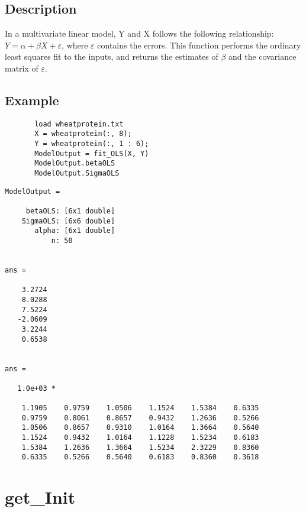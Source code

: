 \documentclass[a4paper,11pt,openany]{memoir}
\begin{document}
\subsection*{Description}

\begin{par}
In a multivariate linear model, Y and X follows the following relationship: $Y=\alpha+\beta X+\varepsilon$, where $\varepsilon$ contains the errors.  This function performs the ordinary least squares fit to the inputs, and returns the estimates of $\beta$ and the covariance matrix of $\varepsilon$.
\end{par} \vspace{1em}


\subsection*{Example}


\begin{verbatim}       load wheatprotein.txt
       X = wheatprotein(:, 8);
       Y = wheatprotein(:, 1 : 6);
       ModelOutput = fit_OLS(X, Y)
       ModelOutput.betaOLS
       ModelOutput.SigmaOLS\end{verbatim}
    
        \color{lightgray}\ttfamily \begin{verbatim}
ModelOutput = 

     betaOLS: [6x1 double]
    SigmaOLS: [6x6 double]
       alpha: [6x1 double]
           n: 50


ans =

    3.2724
    8.0288
    7.5224
   -2.0609
    3.2244
    0.6538


ans =

   1.0e+03 *

    1.1905    0.9759    1.0506    1.1524    1.5384    0.6335
    0.9759    0.8061    0.8657    0.9432    1.2636    0.5266
    1.0506    0.8657    0.9310    1.0164    1.3664    0.5640
    1.1524    0.9432    1.0164    1.1228    1.5234    0.6183
    1.5384    1.2636    1.3664    1.5234    2.3229    0.8360
    0.6335    0.5266    0.5640    0.6183    0.8360    0.3618

\end{verbatim} \rmfamily
\color{black}
    
\newpage

\rmfamily
\color{black}\section{get\_Init}
\end{document}
